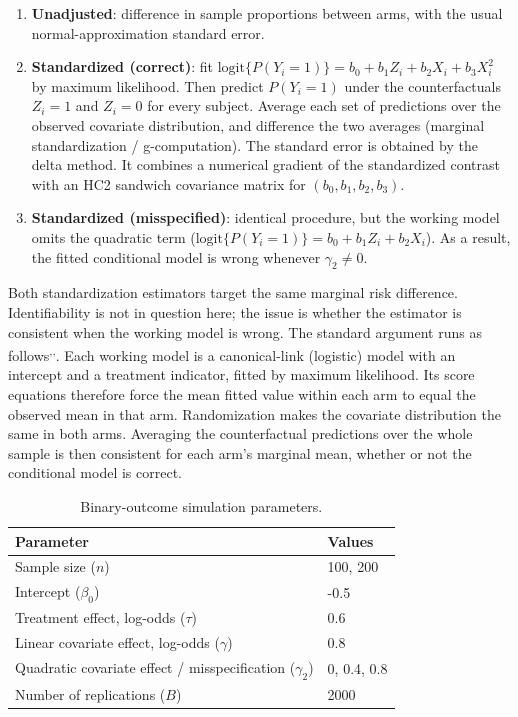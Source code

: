 \documentclass[
  11pt,
]{article}
\providecommand{\tightlist}{%
  \setlength{\itemsep}{0pt}\setlength{\parskip}{0pt}}
\begin{document}
\begin{enumerate}
\def\labelenumi{\arabic{enumi}.}
\tightlist
\item
  \textbf{Unadjusted}: difference in sample proportions
  between arms, with the usual normal-approximation
  standard error.
\item
  \textbf{Standardized (correct)}: fit
  \(\text{logit}\{P(Y_i=1)\} = b_0 + b_1 Z_i + b_2 X_i +
  b_3 X_i^2\) by maximum likelihood. Then predict
  \(P(Y_i=1)\) under the counterfactuals \(Z_i = 1\) and
  \(Z_i = 0\) for every subject. Average each set of
  predictions over the observed covariate distribution,
  and difference the two averages (marginal
  standardization / g-computation). The standard error
  is obtained by the delta method. It combines a
  numerical gradient of the standardized contrast with
  an HC2 sandwich covariance matrix for
  \((b_0, b_1, b_2, b_3)\).
\item
  \textbf{Standardized (misspecified)}: identical procedure,
  but the working model omits the quadratic term
  (\(\text{logit}\{P(Y_i=1)\} = b_0 + b_1 Z_i + b_2 X_i\)).
  As a result, the fitted conditional model is wrong
  whenever \(\gamma_2 \neq 0\).
\end{enumerate}

Both standardization estimators target the same
marginal risk difference. Identifiability is not in
question here; the issue is whether the estimator is
consistent when the working model is wrong. The
standard argument runs as follows\textsuperscript{,,}. Each working model is a
canonical-link (logistic) model with an intercept and a
treatment indicator, fitted by maximum likelihood. Its
score equations therefore force the mean fitted value
within each arm to equal the observed mean in that arm.
Randomization makes the covariate distribution the same
in both arms. Averaging the counterfactual predictions
over the whole sample is then consistent for each arm's
marginal mean, whether or not the conditional model is
correct.

\begin{table}[!h]
\centering
\caption{\label{tab:params-binary}Binary-outcome simulation parameters.}
\centering
\fontsize{10}{12}\selectfont
\begin{tabular}[t]{ll}
\toprule
Parameter & Values\\
\midrule
Sample size ($n$) & 100, 200\\
Intercept ($\beta_0$) & -0.5\\
Treatment effect, log-odds ($\tau$) & 0.6\\
Linear covariate effect, log-odds ($\gamma$) & 0.8\\
Quadratic covariate effect / misspecification ($\gamma_2$) & 0, 0.4, 0.8\\
\addlinespace
Number of replications ($B$) & 2000\\
\bottomrule
\end{tabular}
\end{table}
\end{document}

